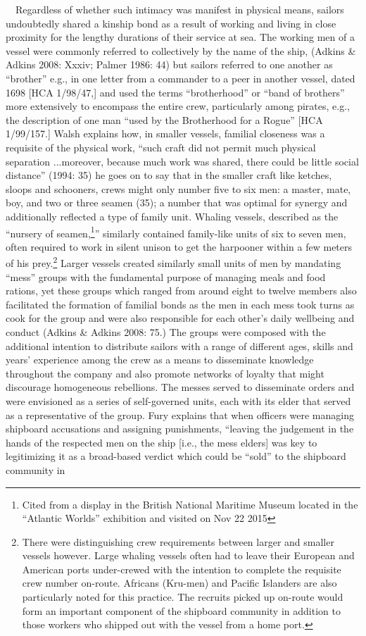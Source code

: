\documentclass[12pt]{article}
\newenvironment{styleStandard}{\renewcommand\baselinestretch{1.0}\setlength\leftskip{0cm}\setlength\rightskip{0cm plus 1fil}\setlength\parindent{0cm}\setlength\parfillskip{0pt plus 1fil}\setlength\parskip{0in plus 1pt}\writerlistparindent\writerlistleftskip\leavevmode\normalfont\normalsize\writerlistlabel\ignorespaces}{\unskip\vspace{0in plus 1pt}\par}
\newcommand\writerlistleftskip{}
\newcommand\writerlistparindent{}
\newcommand\writerlistlabel{}
\begin{document}
\begin{styleStandard}
\ \ Regardless of whether such intimacy was manifest in physical means, sailors undoubtedly shared a kinship bond as a result of working and living in close proximity for the lengthy durations of their service at sea. The working men of a vessel were commonly referred to collectively by the name of the ship, (Adkins \& Adkins 2008: Xxxiv; Palmer 1986: 44) but sailors referred to one another as “brother” e.g., in one letter from a commander to a peer in another vessel, dated 1698 [HCA 1/98/47,] and used the terms “brotherhood” or “band of brothers” more extensively to encompass the entire crew, particularly among pirates, e.g., the description of one man “used by the Brotherhood for a Rogue” [HCA 1/99/157.] Walsh explains how, in smaller vessels, familial closeness was a requisite of the physical work, “such craft did not permit much physical separation ...moreover, because much work was shared, there could be little social distance” (1994: 35) he goes on to say that in the smaller craft like ketches, sloops and schooners, crews might only number five to six men: a master, mate, boy, and two or three seamen (35); a number that was optimal for synergy and additionally reflected a type of family unit. Whaling vessels, described as the “nursery of seamen,\footnote{ Cited from a display in the British National Maritime Museum located in the “Atlantic Worlds” exhibition and visited on Nov 22 2015}” similarly contained family-like units of six to seven men, often required to work in silent unison to get the harpooner within a few meters of his prey.\footnote{ There were distinguishing crew requirements between larger and smaller vessels however. Large whaling vessels often had to leave their European and American ports under-crewed with the intention to complete the requisite crew number on-route. Africans (Kru-men) and Pacific Islanders are also particularly noted for this practice. The recruits picked up on-route would form an important component of the shipboard community in addition to those workers who shipped out with the vessel from a home port. } Larger vessels created similarly small units of men by mandating “mess” groups with the fundamental purpose of managing meals and food rations, yet these groups which ranged from around eight to twelve members also facilitated the formation of familial bonds as the men in each mess took turns as cook for the group and were also responsible for each other’s daily wellbeing and conduct (Adkins \& Adkins 2008: 75.) The groups were composed with the additional intention to distribute sailors with a range of different ages, skills and years’ experience among the crew as a means to disseminate knowledge throughout the company and also promote networks of loyalty that might discourage homogeneous rebellions. The messes served to disseminate orders and were envisioned as a series of self-governed units, each with its elder that served as a representative of the group. Fury explains that when officers were managing shipboard accusations and assigning punishments, “leaving the judgement in the hands of the respected men on the ship [i.e., the mess elders] was key to legitimizing it as a broad-based verdict which could be “sold” to the shipboard community in 
\end{styleStandard}
\end{document}
